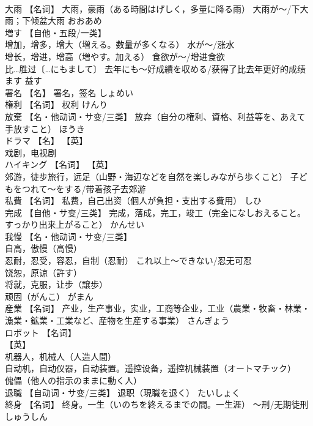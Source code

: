 \documentclass[8pt]{extreport}
\begin{document}
\begin{CJK}{UTF8}{min}
\\	大雨	【名词】 大雨，豪雨（ある時間はげしく，多量に降る雨） 大雨が〜/下大雨；下倾盆大雨	おおあめ	
\\	増す	【自他・五段/一类】 
\\	增加，增多，增大（増える。数量が多くなる） 水が～/涨水 
\\	增长，增进，增高（増やす。加える） 食欲が～/增进食欲 
\\	比…胜过〔…にもまして〕 去年にも～好成績を収める/获得了比去年更好的成绩	ます	益す
\\	署名	【名】 署名，签名	しょめい	
\\	権利	【名词】 权利	けんり	
\\	放棄	【名・他动词・サ变/三类】 放弃（自分の権利、資格、利益等を、あえて手放すこと）	ほうき	
\\	ドラマ	【名】 【英】
\\	戏剧，电视剧		
\\	ハイキング	【名词】 【英】
\\	郊游，徒步旅行，远足（山野・海辺などを自然を楽しみながら歩くこと） 子どもをつれて〜をする/带着孩子去郊游		
\\	私費	【名词】 私费，自己出资（個人が負担・支出する費用）	しひ	
\\	完成	【自他・サ变/三类】 完成，落成，完工，竣工（完全になしおえること。すっかり出来上がること）	かんせい	
\\	我慢	【名・他动词・サ变/三类】 
\\	自高，傲慢（高慢） 
\\	忍耐，忍受，容忍，自制（忍耐） これ以上〜できない/忍无可忍 
\\	饶恕，原谅（許す） 
\\	将就，克服，让步（譲歩） 
\\	顽固（がんこ）	がまん	
\\	産業	【名词】 产业，生产事业，实业，工商等企业，工业（農業・牧畜・林業・漁業・鉱業・工業など、産物を生産する事業）	さんぎょう	
\\	ロボット	【名词】 
\\	【英】
\\	机器人，机械人（人造人間） 
\\	自动机，自动仪器，自动装置。遥控设备，遥控机械装置（オートマチック） 
\\	傀儡（他人の指示のままに動く人）		
\\	退職	【自动词・サ变/三类】 退职（現職を退く）	たいしょく	
\\	終身	【名词】 终身。一生（いのちを終えるまでの間。一生涯） 〜刑/无期徒刑	しゅうしん	

\end{CJK}
\end{document}
